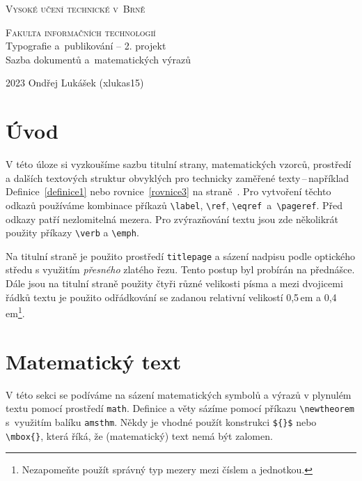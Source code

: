 \documentclass[11pt, a4paper, twocolumn]{article}
\theoremstyle{definition}
\begin{document}
\begin{titlepage}
\begin{center}
\Huge \textsc{Vysoké učení technické v~Brně}

\huge \textsc{Fakulta informačních technologií}\\
{\LARGE Typografie a~publikování -- 2. projekt\\
Sazba dokumentů a~matematických výrazů\\}
\end{center}
{\Large 2023 \hfill Ondřej Lukášek (xlukas15)}
\end{titlepage}

\section*{Úvod}

V této úloze si vyzkoušíme sazbu titulní strany, ma\-te\-ma\-tic\-kých vzorců, prostředí a dalších textových struktur obvyklých pro technicky zaměřené texty\,--\,například De\-fi\-ni\-ce~\ref{definice1} nebo rovnice~\eqref{rovnice3} na straně~\pageref{rovnice3}. Pro vytvoření těchto odkazů používáme kombinace příkazů \verb|\label|, \verb|\ref|, \verb|\eqref|~a~\verb|\pageref|. Před odkazy patří nezlomitelná mezera. Pro zvýrazňování textu jsou zde několikrát po\-u\-ži\-ty příkazy \verb|\verb| a \verb|\emph|.\par
Na titulní straně je použito prostředí \verb|titlepage| a sá\-ze\-ní nadpisu podle optického středu s využitím \emph{přesného} zlatého řezu. Tento postup byl probírán na přednášce. Dále jsou na titulní straně použity čtyři různé velikosti písma a mezi dvojicemi řádků textu je použito odřádkování se zadanou relativní velikostí 0,5\,em a 0,4\,em\footnote{Nezapomeňte použít správný typ mezery mezi číslem a jednotkou.}.

\section{Matematický text}

V této sekci se podíváme na sázení matematických sym\-bo\-lů a výrazů v plynulém textu pomocí prostředí \verb|math|. Definice a věty sázíme pomocí příkazu \verb|\newtheorem| s~využitím balíku \verb|amsthm|. Někdy je vhodné použít kon\-struk\-ci \verb|${}$| nebo \verb|\mbox{}|, která říká, že (matematický) text nemá být zalomen.
\end{document}
